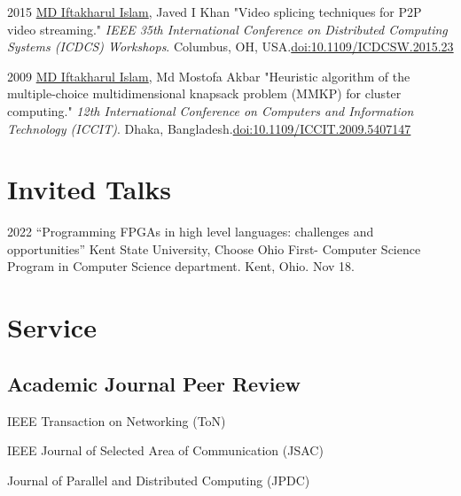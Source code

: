 \documentclass[11pt,letterpaper]{report}
\newcommand{\listitemspace}{0.25em}
\renewenvironment{itemize}
{\begin{list}{}{\setlength{\leftmargin}{0em}
                \setlength{\parskip}{0em}
                \setlength{\itemsep}{\listitemspace}
                \setlength{\parsep}{\listitemspace}}}
{\end{list}}
\begin{document}
\begin{tablist}
        \item[2015] \tab{}\underline{MD Iftakharul Islam}, Javed I Khan "Video splicing techniques for P2P video streaming." \textit{IEEE 35th International Conference on Distributed Computing Systems (ICDCS) Workshops}. Columbus, OH, USA.\@ \href{https://ieeexplore.ieee.org/document/7165086}{doi:10.1109/ICDCSW.2015.23}

        \item[2009] \tab{}\underline{MD Iftakharul Islam}, Md Mostofa Akbar "Heuristic algorithm of the multiple-choice multidimensional knapsack problem (MMKP) for cluster computing." \textit{12th International Conference on Computers and Information Technology (ICCIT)}. Dhaka, Bangladesh.\@ \href{https://ieeexplore.ieee.org/document/5407147}{doi:10.1109/ICCIT.2009.5407147}
        
    \end{tablist}




    \section*{Invited Talks}

    \begin{tablist}

        \item[2022] \tab{}\enquote{Programming FPGAs in high level languages: challenges and opportunities} Kent State University, Choose Ohio First- Computer Science Program in Computer Science department. Kent, Ohio. Nov 18.


    \end{tablist}

    \section*{Service}


    \subsection*{Academic Journal Peer Review}

	\begin{itemize}
		\item IEEE Transaction on Networking (ToN)
		\item IEEE Journal of Selected Area of Communication (JSAC)
		\item Journal of Parallel and Distributed Computing (JPDC)
	\end{itemize}
\end{document}
